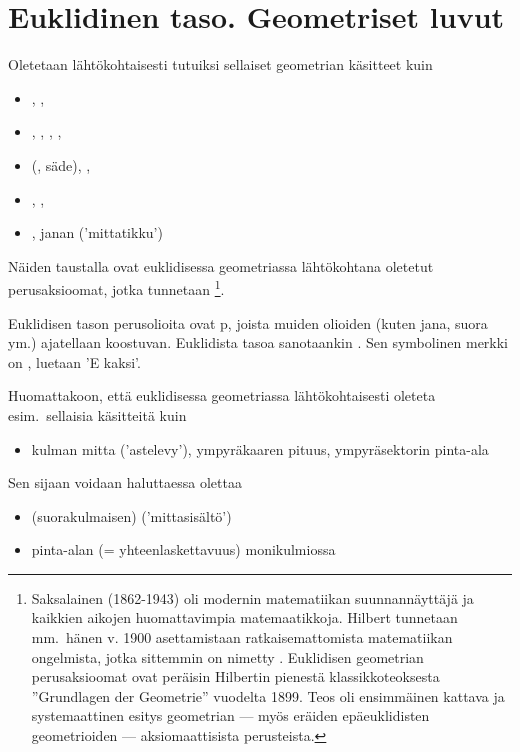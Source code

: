 \section{Euklidinen taso. Geometriset luvut} \label{geomluvut}
\alku
{}

Oletetaan lähtökohtaisesti tutuiksi sellaiset geometrian käsitteet kuin
\begin{itemize}
\item  {}, ,  
\item  {}, , , , 
\item  {} (, säde), , 
\item  {}, , 
\item  {}, janan  ('mittatikku')
\end{itemize}
Näiden taustalla ovat euklidisessa geometriassa lähtökohtana oletetut perusaksioomat, jotka 
tunnetaan \footnote[2]{Saksalainen  (1862-1943)
oli modernin matematiikan suunnannäyttäjä ja kaikkien aikojen huomattavimpia matemaatikkoja. 
Hilbert tunnetaan mm.\ hänen v. 1900 asettamistaan ratkaisemattomista matematiikan ongelmista, 
jotka sittemmin on nimetty . Euklidisen geometrian perusaksioomat ovat
peräisin Hilbertin pienestä klassikkoteoksesta ''Grundlagen der Geometrie'' vuodelta 1899. Teos
oli ensimmäinen kattava ja systemaattinen esitys geometrian --- myös eräiden epäeuklidisten 
geometrioiden ---  aksiomaattisista perusteista.}.

Euklidisen tason perusolioita ovat p, joista muiden olioiden (kuten jana, suora 
ym.) ajatellaan koostuvan. Euklidista tasoa sanotaankin . Sen symbolinen
merkki on \Ekaksi, luetaan 'E kaksi'.
\vspace{5mm}
\begin{figure}[htb]
\begin{center}
\end{center}
\label{fig:oliot}
\end{figure}

Huomattakoon, että euklidisessa geometriassa  lähtökohtaisesti oleteta esim.\ 
sellaisia käsitteitä kuin
\begin{itemize}
\item  kulman mitta ('astelevy'), ympyräkaaren pituus, ympyräsektorin pinta-ala
\end{itemize}
Sen sijaan voidaan haluttaessa olettaa
\begin{itemize}
\item  (suorakulmaisen)  ('mittasisältö')
\item  pinta-alan \kor{additiivisuus} (= yhteenlaskettavuus) monikulmiossa
\end{itemize}

